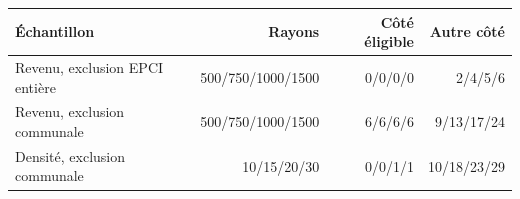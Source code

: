 \begin{tabularx}{\linewidth}{Xrrr}
\toprule
Échantillon & Rayons & Côté éligible & Autre côté \\
\midrule
Revenu, exclusion EPCI entière & 500/750/1000/1500 & 0/0/0/0 & 2/4/5/6 \\
Revenu, exclusion communale & 500/750/1000/1500 & 6/6/6/6 & 9/13/17/24 \\
Densité, exclusion communale & 10/15/20/30 & 0/0/1/1 & 10/18/23/29 \\
\bottomrule
\end{tabularx}
